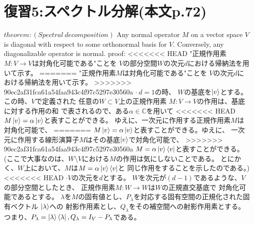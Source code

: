 \section{\Large 復習5:スペクトル分解(本文p.72)}
$theorem :(Spectral~decomposition)$
Any normal operator $M$ on a vector space $V$ is
diagonal with respect to some orthonormal basis for $V$.
Conversely, any diagonalizable operator is normal.
\newline
{\large proof:}
<<<<<<< HEAD
"正規作用素$M:V \rightarrow V$は対角化可能である"ことを
$V$の部分空間$W$の次元$d$における帰納法を用いて示す。
=======
"正規作用素$M$は対角化可能である"ことを
$V$の次元$d$における帰納法を用いて示す。
>>>>>>> 90ec2af31fca61a54faa943c4f97c5297e30560a
\newline
$\cdot ~d = 1$の時、
$W$の基底を$\ket{v}$とする。この時、$V$で定義された
任意の$W \subset V$上の正規作用素
$M:V \rightarrow V$の作用は、基底に対する作用の和
で表されるので、ある$\alpha \in \mathbb{C}$を用いて
<<<<<<< HEAD
$M\ket{v} = \alpha \ket{v}$と表すことができる。
ゆえに、一次元に作用する正規作用素$M$は対角化可能で、
=======
$M\ket{v} = \alpha \ket{v}$と表すことができる。ゆえに、
一次元に作用する線形演算子$M$はその基底$\ket{v}$で対角化可能で、
>>>>>>> 90ec2af31fca61a54faa943c4f97c5297e30560a
$M = \alpha \ket{v}\bra{v}$と表すことができる。
(ここで大事なのは、$W \setminus V$における$M$の作用は気にしないことである。
とにかく、$W$上において、$M$は$M = \alpha \ket{v}\bra{v}$と
同じ作用をすることを示したのである。)
\newline
<<<<<<< HEAD
$\cdot Vの次元をdとする。$
$W$を次元が$(d - 1)$であるような、$V$の部分空間としたとき、
正規作用素$M:W \rightarrow W$は$W$の正規直交基底で
対角化可能であるとする。
$\lambda$を$M$の固有値とし、$P_\lambda $を対応する固有空間の正規化された固有ベクトル
$\ket{\lambda}$への
射影作用素とし、$Q_\lambda $をその補空間への射影作用素とする。
つまり、$P_\lambda  = \ket{\lambda} \bra{\lambda}, Q_\lambda  = I_V - P_\lambda $である。

